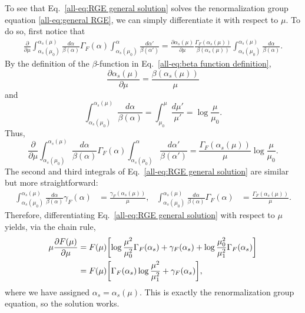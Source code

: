 \documentclass[../thesis.tex]{subfiles}
\begin{document}
	To see that Eq.~\ref{all-eq:RGE general solution} solves the renormalization group equation \ref{all-eq:general RGE}, we can simply differentiate it with respect to $\mu$. To do so, first notice that
	\begin{equation}
	\begin{aligned}
		\frac{\partial}{\partial \mu} \int_{\alpha_s(\mu_0)}^{\alpha_s(\mu)} \frac{d\alpha}{\beta(\alpha)}\Gamma_F(\alpha) \int_{\alpha_s(\mu_0)}^\alpha \frac{d\alpha'}{\beta(\alpha')} = \frac{\partial \alpha_s(\mu)}{\partial \mu} \frac{\Gamma_F(\alpha_s(\mu))}{\beta(\alpha_s(\mu))} \int_{\alpha_s(\mu_0)}^{\alpha_s(\mu)} \frac{d\alpha}{\beta(\alpha)}.
	\end{aligned}
	\end{equation}
	By the definition of the $\beta$-function in Eq.~\ref{all-eq:beta function definition},
	\begin{equation}
		\frac{\partial \alpha_s(\mu)}{\partial \mu} = \frac{\beta(\alpha_s(\mu))}{\mu}
	\end{equation}
	and
	\begin{equation}
		\int_{\alpha_s(\mu_0)}^{\alpha_s(\mu)} \frac{d\alpha}{\beta(\alpha)} = \int_{\mu_0}^\mu \frac{d\mu'}{\mu'} = \log\frac{\mu}{\mu_0}.
	\end{equation}
	Thus,
	\begin{equation}
		\frac{\partial}{\partial \mu} \int_{\alpha_s(\mu_0)}^{\alpha_s(\mu)} \frac{d\alpha}{\beta(\alpha)}\Gamma_F(\alpha) \int_{\alpha_s(\mu_0)}^\alpha \frac{d\alpha'}{\beta(\alpha')} = \frac{\Gamma_F(\alpha_s(\mu))}{\mu} \log \frac{\mu}{\mu_0}.
	\end{equation}
	The second and third integrals of Eq.~\ref{all-eq:RGE general solution} are similar but more straightforward:
	\begin{align}
		\int_{\alpha_s(\mu_0)}^{\alpha_s(\mu)} \frac{d\alpha}{\beta(\alpha)}\gamma_F(\alpha) &= \frac{\gamma_F(\alpha_s(\mu))}{\mu}, & \int_{\alpha_s(\mu_0)}^{\alpha_s(\mu)} \frac{d\alpha}{\beta(\alpha)}\Gamma_F(\alpha) &= \frac{\Gamma_F(\alpha_s(\mu))}{\mu}.
	\end{align}
	Therefore, differentiating Eq.~\ref{all-eq:RGE general solution} with respect to $\mu$ yields, via the chain rule,
	\begin{equation}
	\begin{aligned}
		\mu \frac{\partial F(\mu)}{\partial \mu} &= F(\mu) \qty[\log\frac{\mu^2}{\mu_0^2} \Gamma_F(\alpha_s) + \gamma_F(\alpha_s) + \log\frac{\mu_0^2}{\mu_1^2}\Gamma_F(\alpha_s)] \\
		&= F(\mu) \qty[\Gamma_F(\alpha_s)\log\frac{\mu^2}{\mu_1^2} + \gamma_F(\alpha_s)],
	\end{aligned}
	\end{equation}
	where we have assigned $\alpha_s = \alpha_s(\mu)$. This is exactly the renormalization group equation, so the solution works.
\end{document}
